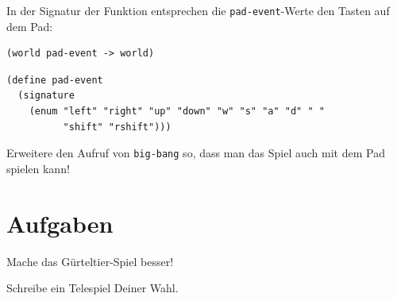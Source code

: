 %
In der Signatur der Funktion entsprechen die
\lstinline{pad-event}-Werte den Tasten auf dem Pad:
%
\begin{lstlisting}
(world pad-event -> world)
\end{lstlisting}
%
\begin{lstlisting}
(define pad-event
  (signature
    (enum "left" "right" "up" "down" "w" "s" "a" "d" " "
          "shift" "rshift")))
\end{lstlisting}
%
\begin{aufgabeinline}
  Erweitere den Aufruf von \lstinline{big-bang} so, dass man das Spiel
  auch mit dem Pad spielen kann!
\end{aufgabeinline}

\section*{Aufgaben}

\begin{aufgabe}
  Mache das Gürteltier-Spiel besser!
\end{aufgabe}

\begin{aufgabe}
  Schreibe ein Telespiel Deiner Wahl.
\end{aufgabe}


